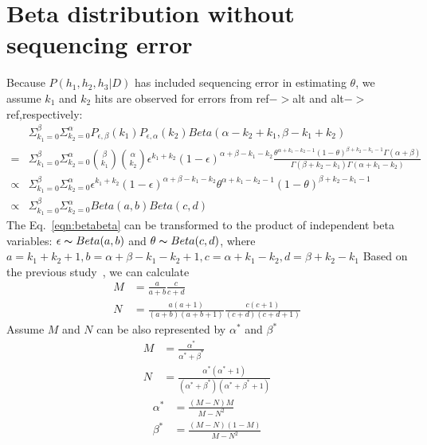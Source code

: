 \documentclass{article}
\begin{document}
\section{Beta distribution without sequencing error}
Because $P(h_1,h_2,h_3|D)$ has included sequencing error in estimating $\theta$, we assume $k_1$ and $k_2$ hits are observed for errors from ref$->$alt and alt$->$ref,respectively:
\begin{equation}
\begin{split}
&\Sigma_{k_1=0}^\beta \Sigma_{k_2=0}^\alpha P_{\epsilon,\beta}(k_1) P_{\epsilon,\alpha}(k_2) Beta(\alpha-k_2+k_1,\beta-k_1+k_2)\\
=&\Sigma_{k_1=0}^\beta \Sigma_{k_2=0}^\alpha \binom \beta {k_1} \binom \alpha {k_2} \epsilon^{k_1+k_2}(1-\epsilon)^{\alpha+\beta-k_1-k_2}\frac{\theta^{\alpha+k_1-k_2-1}(1-\theta)^{\beta+k_2-k_1-1}\Gamma(\alpha+\beta)}{\Gamma(\beta+k_2-k_1)\Gamma(\alpha+k_1-k_2)}\\
\varpropto& \Sigma_{k_1=0}^\beta \Sigma_{k_2=0}^\alpha \epsilon^{k_1+k_2}(1-\epsilon)^{\alpha+\beta-k_1-k_2}\theta^{\alpha+k_1-k_2-1}(1-\theta)^{\beta+k_2-k_1-1}\\
\varpropto&\Sigma_{k_1=0}^\beta \Sigma_{k_2=0}^\alpha Beta(a,b)Beta(c,d)
\end{split}
\end{equation}\label{eqn:betabeta}
The Eq.~\ref{eqn:betabeta} can be transformed to the product of independent beta variables: $\epsilon \thicksim Beta(a,b)$ and $\theta \thicksim Beta(c,d)$, where $a=k_1+k_2+1,b=\alpha+\beta-k_1-k_2+1,c=\alpha+k_1-k_2,d=\beta+k_2-k_1$
Based on the previous study~\cite{betabeta}, we can calculate
\begin{equation}
\begin{split}
M&=\frac{a}{a+b}\frac{c}{c+d}\\
N&=\frac{a(a+1)}{(a+b)(a+b+1)}\frac{c(c+1)}{(c+d)(c+d+1)}
\end{split}
\end{equation}
Assume $M$ and $N$ can be also represented by $\alpha^\ast$ and $\beta^\ast$
\begin{equation}
\begin{split}
M&=\frac{\alpha^\ast}{\alpha^\ast+\beta^\ast}\\
N&=\frac{\alpha^\ast(\alpha^\ast+1)}{(\alpha^\ast+\beta^\ast)(\alpha^\ast+\beta^\ast+1)}
\end{split}
\end{equation}
\begin{equation}
\begin{split}
\alpha^\ast&=\frac{(M-N)M}{M-N^2}\\
\beta^\ast&=\frac{(M-N)(1-M)}{M-N^2}
\end{split}
\end{equation}
\end{document}
